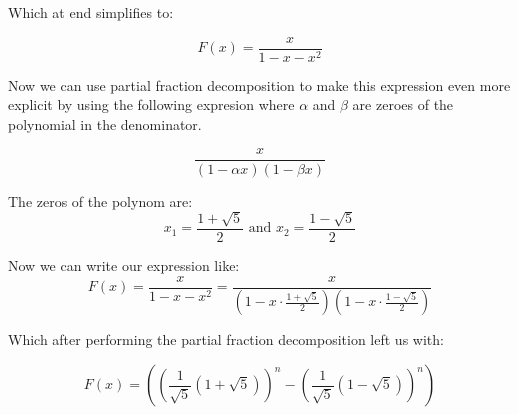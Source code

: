 Which at end simplifies to:

\[
F(x) = \frac{x}{1 - x - x^2}
\]

Now we can use partial fraction decomposition to make this expression even more explicit
by using the following expresion where \(\alpha\) and \(\beta\) are zeroes of the polynomial in the
denominator.

\[
\frac{x}{\left(1 - \alpha x\right)\left(1 - \beta x\right)}
\]

The zeros of the polynom are:
\[
    x_1 = \frac{1 + \sqrt{5}}{2} \text{ and }  x_2 = \frac{1 - \sqrt{5}}{2}    
\]


Now we can write our expression like:
\[
F(x) = \frac{x}{1 - x - x^2} = \frac{x}{\left(1 - x \cdot \frac{1 + \sqrt{5}}{2}\right)\left(1 - x \cdot \frac{1 - \sqrt{5}}{2}\right)}
\]

Which after performing the partial fraction decomposition left us with:

\[
    F(x) = \left( \left( \frac{1}{\sqrt{5}} (1 + \sqrt{5}) \right)^n - \left( \frac{1}{\sqrt{5}} (1 - \sqrt{5}) \right)^n \right)
\]

\QED


\newpage
